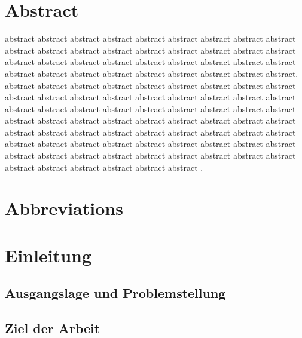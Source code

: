 \documentclass[11pt,a4paper,titlepage]{scrartcl}
\begin{document}

\cfoot{\pagemark}
\newpage
\section*{Abstract}
\normalsize
abstract abstract abstract abstract abstract abstract abstract abstract abstract abstract abstract abstract abstract abstract abstract abstract abstract abstract abstract abstract abstract abstract abstract abstract abstract abstract abstract abstract abstract abstract abstract abstract abstract abstract abstract abstract. abstract abstract abstract abstract abstract abstract abstract abstract abstract abstract abstract abstract abstract abstract abstract abstract abstract abstract abstract abstract abstract abstract abstract abstract abstract abstract abstract abstract abstract abstract abstract abstract abstract abstract abstract abstract abstract abstract abstract abstract abstract abstract abstract abstract abstract abstract abstract abstract abstract abstract abstract abstract abstract abstract abstract abstract abstract abstract abstract abstract abstract abstract abstract abstract abstract abstract abstract abstract abstract .

\newpage





\tableofcontents

\newpage

\listoffigures

\newpage

\listoftables

\newpage
\section*{Abbreviations}

\newpage


\section{Einleitung \label{sect:Introduction}}
\subsection{Ausgangslage und Problemstellung}
\subsection{Ziel der Arbeit}
\end{document}
